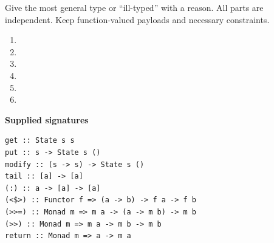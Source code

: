 


\mockrules
Give the most general type or ``ill-typed'' with a reason. All parts are
independent. Keep function-valued payloads and necessary constraints.
\begin{enumerate}[label=(\alph*)]
\item {}
\answer{[Answer.]}
\item {}
\answer{[Answer.]}
\item {}
\answer{[Answer.]}
\item {}
\item {}
\item {}
\end{enumerate}
\textbf{Supplied signatures}
\par\noindent\begin{minipage}{\linewidth}
\begin{lstlisting}
get :: State s s
put :: s -> State s ()
modify :: (s -> s) -> State s ()
tail :: [a] -> [a]
(:) :: a -> [a] -> [a]
(<$>) :: Functor f => (a -> b) -> f a -> f b
(>>=) :: Monad m => m a -> (a -> m b) -> m b
(>>) :: Monad m => m a -> m b -> m b
return :: Monad m => a -> m a
\end{lstlisting}
\end{minipage}\par


